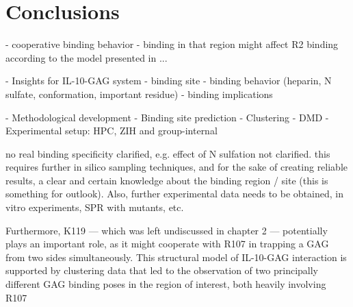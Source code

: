 \chapter{Conclusions}


- cooperative binding behavior
- binding in that region might affect R2 binding according to the model
    presented in ...






    - Insights for IL-10-GAG system
        - binding site
        - binding behavior (heparin, N sulfate, conformation, important residue)
        - binding implications




    - Methodological development
        - Binding site prediction
        - Clustering
        - DMD
        - Experimental setup: HPC, ZIH and group-internal


    no real binding specificity clarified, e.g. effect of N sulfation not clarified. this requires further in silico sampling techniques, and for the sake of creating reliable results, a clear and certain knowledge about the binding region / site (this is something for outlook). Also, further experimental data needs to be obtained, in vitro experiments, SPR with mutants, etc.


    Furthermore, K119 — which
was left undiscussed in chapter 2 — potentially plays an important
role, as it might cooperate with R107 in trapping a GAG from two
sides simultaneously. This structural model of IL-10-GAG interaction
is supported by clustering data that led to the observation of two
principally different GAG binding poses in the region of interest, both
heavily involving R107